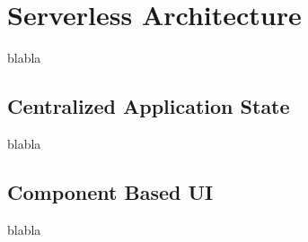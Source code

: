 \section{Serverless Architecture}\label{sec:architecture}

blabla

\subsection{Centralized Application State}\label{ssub:centr_state}

blabla

\subsection{Component Based UI}


blabla